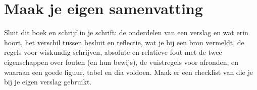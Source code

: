 

\begin{oefeningen}

\end{oefeningen}


\begin{oefeningen}




\end{oefeningen}


\ifzelfstudie
\section*{Maak je eigen samenvatting}
Sluit dit boek en schrijf in je schrift: de onderdelen van een verslag en wat erin hoort, het verschil tussen besluit en reflectie, wat je bij een bron vermeldt, de regels voor wiskundig schrijven, absolute en relatieve fout met de twee eigenschappen over fouten (en hun bewijs), de vuistregels voor afronden, en waaraan een goede figuur, tabel en dia voldoen. Maak er een checklist van die je bij je eigen verslag gebruikt.
\fi
